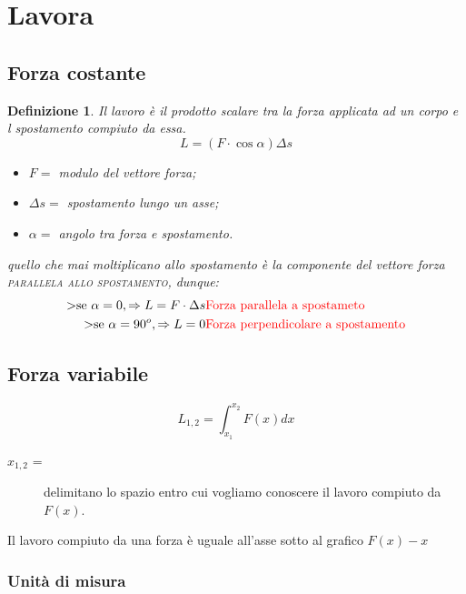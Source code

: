 \documentclass{book}
\newtheorem{defi}{Definizione}[section]
\begin{document}
\section{Lavora}
\label{sec:lavoro}

\subsection{Forza costante}
\label{sec:forcostlav}

\begin{defi}
  Il lavoro è il prodotto scalare tra la forza applicata ad un corpo e l spostamento compiuto da essa.
  \begin{equation}
    \label{eq:lavoro}
    L=(F\cdot \cos \alpha) \Delta s
  \end{equation}
  \begin{itemize}
  \item $F=$ modulo del vettore forza;
  \item $\Delta s=$ spostamento lungo un asse;
  \item $\alpha=$ angolo tra forza e spostamento.
  \end{itemize}
  quello che mai moltiplicano allo spostamento è {\color{red}la componente del vettore forza \textsc{parallela allo spostamento}}, dunque:
  \begin{eqnarray*}
    \text{>se } \alpha = 0, \Rightarrow L = F\cdot \Delta s & \text{\color{red}Forza parallela a spostameto}\\
    \text{>se } \alpha = 90^o, \Rightarrow L = 0 & \text{\color{red}Forza perpendicolare a spostamento} 
  \end{eqnarray*}
\end{defi}

\subsection{Forza variabile}
\label{sec:forzavarlav}
\begin{equation}
  \label{eq:forzavarlav}
  L_{1,2}=\int_{x_1}^{x_2}F(x)dx
\end{equation}
\begin{description}
\item[$x_{1,2}$ =] delimitano lo spazio entro cui vogliamo conoscere il lavoro compiuto da $F(x)$. 
\end{description}
Il lavoro compiuto da una forza è uguale all'asse sotto al grafico $F(x)-x$

\subsubsection{Unità di misura}
\label{sec:joule}
\end{document}
